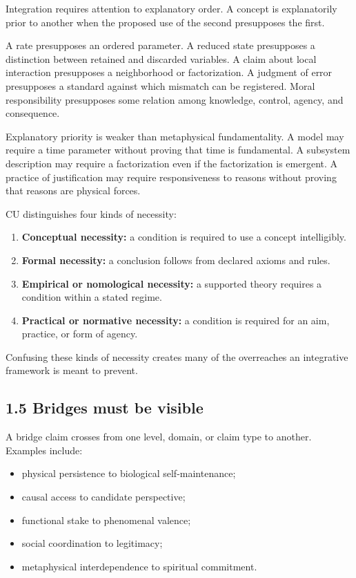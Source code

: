 \documentclass[
  11pt,
]{article}
\providecommand{\tightlist}{%
  \setlength{\itemsep}{0pt}\setlength{\parskip}{0pt}}
\begin{document}
Integration requires attention to explanatory order. A concept is
explanatorily prior to another when the proposed use of the second
presupposes the first.

A rate presupposes an ordered parameter. A reduced state presupposes a
distinction between retained and discarded variables. A claim about
local interaction presupposes a neighborhood or factorization. A
judgment of error presupposes a standard against which mismatch can be
registered. Moral responsibility presupposes some relation among
knowledge, control, agency, and consequence.

Explanatory priority is weaker than metaphysical fundamentality. A model
may require a time parameter without proving that time is fundamental. A
subsystem description may require a factorization even if the
factorization is emergent. A practice of justification may require
responsiveness to reasons without proving that reasons are physical
forces.

CU distinguishes four kinds of necessity:

\begin{enumerate}
\def\labelenumi{\arabic{enumi}.}
\tightlist
\item
  \textbf{Conceptual necessity:} a condition is required to use a
  concept intelligibly.
\item
  \textbf{Formal necessity:} a conclusion follows from declared axioms
  and rules.
\item
  \textbf{Empirical or nomological necessity:} a supported theory
  requires a condition within a stated regime.
\item
  \textbf{Practical or normative necessity:} a condition is required for
  an aim, practice, or form of agency.
\end{enumerate}

Confusing these kinds of necessity creates many of the overreaches an
integrative framework is meant to prevent.

\subsection{1.5 Bridges must be visible}\label{bridges-must-be-visible}

A bridge claim crosses from one level, domain, or claim type to another.
Examples include:

\begin{itemize}
\tightlist
\item
  physical persistence to biological self-maintenance;
\item
  causal access to candidate perspective;
\item
  functional stake to phenomenal valence;
\item
  social coordination to legitimacy;
\item
  metaphysical interdependence to spiritual commitment.
\end{itemize}
\end{document}
